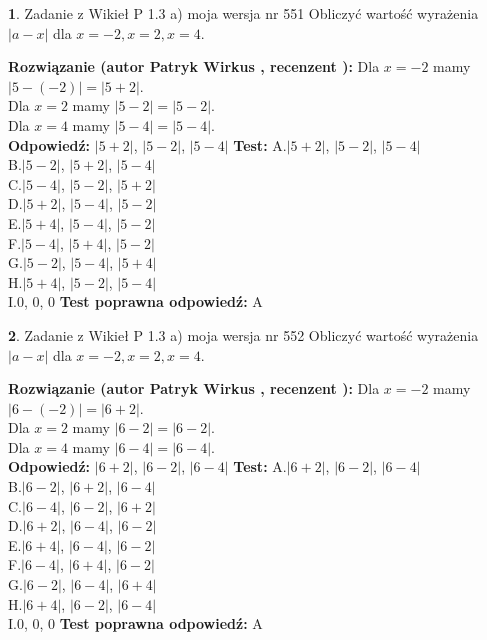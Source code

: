 \documentclass[12pt, a4paper]{article}
\theoremstyle{definition} %
\newtheorem{zad}{}
\newcommand{\zadStart}[1]{\begin{zad}#1\newline}
\newcommand{\zadStop}{\end{zad}}
\newcommand{\rozwStart}[2]{\noindent \textbf{Rozwiązanie (autor #1 , recenzent #2): }\newline}
\newcommand{\rozwStop}{\newline}
\newcommand{\odpStart}{\noindent \textbf{Odpowiedź:}\newline}
\newcommand{\odpStop}{\newline}
\newcommand{\testStart}{\noindent \textbf{Test:}\newline}
\newcommand{\testStop}{\newline}
\newcommand{\kluczStart}{\noindent \textbf{Test poprawna odpowiedź:}\newline}
\newcommand{\kluczStop}{\newline}
\begin{document}
\zadStart{Zadanie z Wikieł P 1.3 a) moja wersja nr 551}
Obliczyć wartość wyrażenia $|a - x|$ dla $x=-2,x=2,x=4$.
\zadStop
\rozwStart{Patryk Wirkus}{}
Dla $x = -2$ mamy $|5 - (-2)| = |5 + 2|$.\\
Dla $x = 2$ mamy $|5 - 2| = |5 - 2|$.\\
Dla $x = 4$ mamy $|5 - 4| = |5 - 4|$.\\
\rozwStop
\odpStart
$|5 + 2|$, $|5 - 2|$, $|5 - 4|$
\odpStop
\testStart
A.$|5 + 2|$, $|5 - 2|$, $|5 - 4|$\\
B.$|5 - 2|$, $|5 + 2|$, $|5 - 4|$\\
C.$|5 - 4|$, $|5 - 2|$, $|5 + 2|$\\
D.$|5 + 2|$, $|5 - 4|$, $|5 - 2|$\\
E.$|5 + 4|$, $|5 - 4|$, $|5 - 2|$\\
F.$|5 - 4|$, $|5 + 4|$, $|5 - 2|$\\
G.$|5 - 2|$, $|5 - 4|$, $|5 + 4|$\\
H.$|5 + 4|$, $|5 - 2|$, $|5 - 4|$\\
I.$0$, $0$, $0$
\testStop
\kluczStart
A
\kluczStop



\zadStart{Zadanie z Wikieł P 1.3 a) moja wersja nr 552}
Obliczyć wartość wyrażenia $|a - x|$ dla $x=-2,x=2,x=4$.
\zadStop
\rozwStart{Patryk Wirkus}{}
Dla $x = -2$ mamy $|6 - (-2)| = |6 + 2|$.\\
Dla $x = 2$ mamy $|6 - 2| = |6 - 2|$.\\
Dla $x = 4$ mamy $|6 - 4| = |6 - 4|$.\\
\rozwStop
\odpStart
$|6 + 2|$, $|6 - 2|$, $|6 - 4|$
\odpStop
\testStart
A.$|6 + 2|$, $|6 - 2|$, $|6 - 4|$\\
B.$|6 - 2|$, $|6 + 2|$, $|6 - 4|$\\
C.$|6 - 4|$, $|6 - 2|$, $|6 + 2|$\\
D.$|6 + 2|$, $|6 - 4|$, $|6 - 2|$\\
E.$|6 + 4|$, $|6 - 4|$, $|6 - 2|$\\
F.$|6 - 4|$, $|6 + 4|$, $|6 - 2|$\\
G.$|6 - 2|$, $|6 - 4|$, $|6 + 4|$\\
H.$|6 + 4|$, $|6 - 2|$, $|6 - 4|$\\
I.$0$, $0$, $0$
\testStop
\kluczStart
A
\kluczStop
\end{document}
